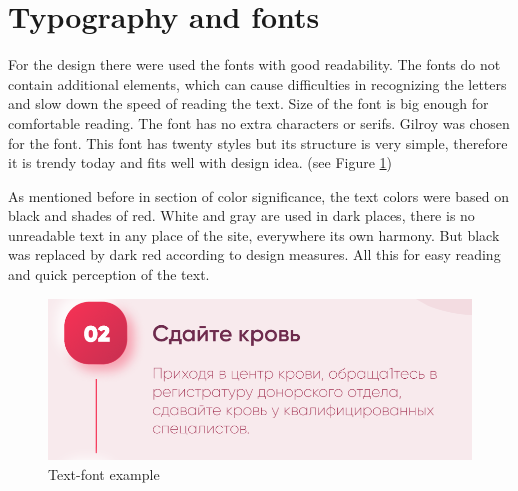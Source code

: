 \section{Typography and fonts}
For the design there were used the fonts with good readability. The fonts do not contain additional elements, which can cause difficulties in recognizing the letters and slow down the speed of reading the text. Size of the font is big enough for comfortable reading. The font has no extra characters or serifs. Gilroy was chosen for the font. This font has twenty styles but its structure is very simple, therefore it is trendy today and fits well with design idea. (see Figure \ref{fig:font})
\par
As mentioned before in section of color significance, the text colors were based on black and shades of red. White and gray are used in dark places, there is no unreadable text in any place of the site, everywhere its own harmony. But black was replaced by dark red according to design measures. All this for easy reading and quick perception of the text. 
\par
\begin{figure}[h]
    \centering
    \includegraphics[scale=0.5]{figures/5.png}
    \caption{Text-font example}
    \label{fig:font}
\end{figure}

